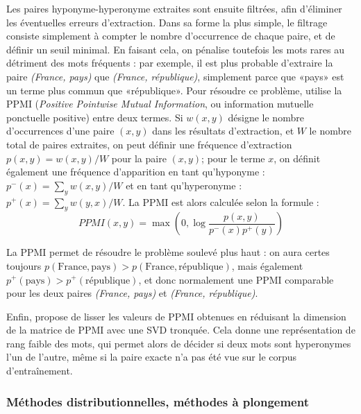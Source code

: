 Les paires hyponyme-hyperonyme extraites sont ensuite filtrées, afin d'éliminer les éventuelles erreurs d'extraction. Dans sa forme la plus simple, le filtrage consiste simplement à compter le nombre d'occurrence de chaque paire, et de définir un seuil minimal. En faisant cela, on pénalise toutefois les mots rares au détriment des mots fréquents : par exemple, il est plus probable d'extraire la paire \textit{(France, pays)} que \textit{(France, république)}, simplement parce que «pays» est un terme plus commun que «république». Pour résoudre ce problème, \cite{turney2001mining} utilise la PPMI (\textit{Positive Pointwise Mutual Information}, ou information mutuelle ponctuelle positive) entre deux termes. Si $w(x, y)$ désigne le nombre d'occurrences d'une paire $(x, y)$ dans les résultats d'extraction, et $W$ le nombre total de paires extraites, on peut définir une fréquence d'extraction $p(x, y) = w(x,y) / W$ pour la paire $(x, y)$; pour le terme $x$, on définit également une fréquence d'apparition en tant qu'hyponyme : $p^-(x) = \sum_y w(x, y) / W$ et en tant qu'hyperonyme : $p^+(x) = \sum_y w(y, x) / W$. La PPMI est alors calculée selon la formule :
\begin{equation}
    PPMI(x, y) = \max \left(0, \log\frac{p(x, y)}{p^-(x)p^+(y)} \right)
\end{equation}

La PPMI permet de résoudre le problème soulevé plus haut : on aura certes toujours $p(\textrm{France}, \textrm{pays}) > p(\textrm{France}, \textrm{république})$, mais également $p^+(\textrm{pays}) > p^+(\textrm{république})$, et donc normalement une PPMI comparable pour les deux paires \textit{(France, pays)} et \textit{(France, république)}.

Enfin, \cite{roller-etal-2018-hearst} propose de lisser les valeurs de PPMI obtenues en réduisant la dimension de la matrice de PPMI avec une SVD tronquée. Cela donne une représentation de rang faible des mots, qui permet alors de décider si deux mots sont hyperonymes l'un de l'autre, même si la paire exacte n'a pas été vue sur le corpus d'entraînement.


\subsubsection{Méthodes distributionnelles, méthodes à plongement}

